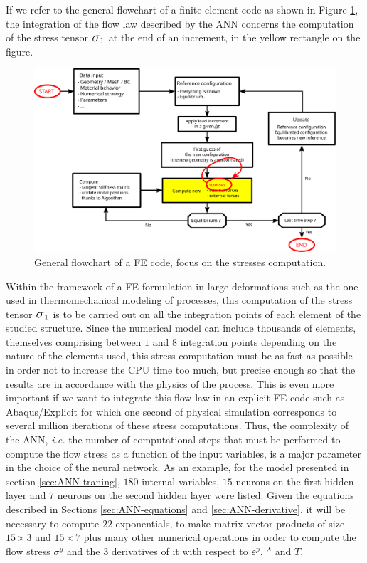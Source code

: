 \documentclass[algorithms,article,submit,pdftex,moreauthors]{Definitions/mdpi}
\makeatletter
\DeclareRobustCommand{\Sig}{\mbox{\Large\ensuremath{\sigma}}}
\DeclareRobustCommand{\mdot}[1]{\accentset{\mbox{\bfseries .}}{#1}}
\DeclareRobustCommand{\ie}{\emph{i.e.}\@\xspace}
\makeatother
\begin{document}
If we refer to the general flowchart of a finite element code as shown in Figure \ref{fig:StressUpdate}, the integration of the flow law described by the ANN concerns the computation of the stress tensor $\Sig_1$ at the end of an increment, in the yellow rectangle on the figure.
\begin{figure}[!ht]
\centering
\includegraphics[width=0.9\columnwidth]{Figures/StressUpdate}
\caption{General flowchart of a FE code, focus on the stresses computation.}
\label{fig:StressUpdate}
\end{figure}
Within the framework of a FE formulation in large deformations such as the one used in thermomechanical modeling of processes, this computation of the stress tensor $\Sig_1$ is to be carried out on all the integration points of each element of the studied structure.
Since the numerical model can include thousands of elements, themselves comprising between $1$ and $8$ integration points depending on the nature of the elements used, this stress computation must be as fast as possible in order not to increase the CPU time too much, but precise enough so that the results are in accordance with the physics of the process.
This is even more important if we want to integrate this flow law in an explicit FE code such as Abaqus/Explicit for which one second of physical simulation corresponds to several million iterations of these stress computations.
Thus, the complexity of the ANN, \ie the number of computational steps that must be performed to compute the flow stress as a function of the input variables, is a major parameter in the choice of the neural network.
As an example, for the model presented in section \ref{sec:ANN-traning}, $180$ internal variables, $15$ neurons on the first hidden layer and $7$ neurons on the second hidden layer were listed.
Given the equations described in Sections \ref{sec:ANN-equations} and \ref{sec:ANN-derivative}, it will be necessary to compute $22$ exponentials, to make matrix-vector products of size $15\times3$ and $15\times7$ plus many other numerical operations in order to compute the flow stress $\sigma^y$ and the $3$ derivatives of it with respect to $\varepsilon^p$, $\mdot\varepsilon$ and $T$.
\end{document}
